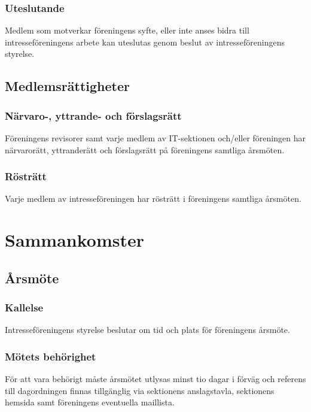 \documentclass[11pt, noincludeaddress]{classes/cthit}
\begin{document}
\subsubsection{Uteslutande}
Medlem som motverkar föreningens syfte, eller inte anses bidra till intresseföreningens arbete kan uteslutas genom beslut av intresseföreningens styrelse. 

\subsection{Medlemsrättigheter}

\subsubsection{Närvaro-, yttrande- och förslagsrätt}
Föreningens revisorer samt varje medlem av IT-sektionen och/eller föreningen har närvarorätt, yttranderätt och förslagsrätt på föreningens samtliga årsmöten. 

\subsubsection{Rösträtt}
Varje medlem av intresseföreningen har rösträtt i föreningens samtliga årsmöten.





\section{Sammankomster}

\subsection{Årsmöte}

\subsubsection{Kallelse}
Intresseföreningens styrelse beslutar om tid och plats för föreningens årsmöte. 

\subsubsection{Mötets behörighet}
För att vara behörigt måste årsmötet utlysas minst tio dagar i förväg och referens till dagordningen finnas tillgänglig via sektionens anslagstavla, sektionens hemsida samt föreningens eventuella maillista. 
\end{document}
